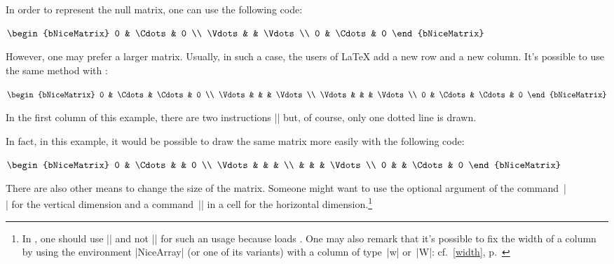 \documentclass[dvipsnames]{article}
\def\interitem{\vspace{7mm plus 2 mm minus 3mm}}
\begin{document}
\interitem In order to represent the null matrix, one can use the following
code:

\nobreak
\bigskip
\begin{Code}[width=10cm,show-output]
$\begin{bNiceMatrix}
0      & \Cdots & 0      \\
\Vdots &        & \Vdots \\
0      & \Cdots & 0 
\end{bNiceMatrix}$
\end{Code}

\bigskip
However, one may prefer a larger matrix. Usually, in such a case, the users of
LaTeX add a new row and a new column. It's possible to use the same method
with :

\nobreak
\bigskip
\begin{Code}[width=10cm,show-output]
$\begin{bNiceMatrix}
0      & \Cdots & \Cdots & 0      \\
\Vdots &        &        & \Vdots \\
\Vdots &        &        & \Vdots \\
0      & \Cdots & \Cdots & 0 
\end{bNiceMatrix}$
\end{Code}

\bigskip
In the first column of this example, there are two instructions |\Vdots| but,
of course, only one dotted line is drawn.

\bigskip
In fact, in this example, it would be possible to draw the same matrix more
easily with the following code:

\nobreak
\bigskip
\begin{Code}[width=10cm,show-output]
$\begin{bNiceMatrix}
0       & \Cdots &        & 0      \\
\Vdots  &        &        &        \\
        &        &        & \Vdots \\
0       &        & \Cdots & 0 
\end{bNiceMatrix}$
\end{Code}

\bigskip 
There are also other means to change the size of the matrix. Someone might
want to use the optional argument of the command~|\\| for the vertical
dimension and a command~|\hspace*| in a cell for the horizontal
dimension.\footnote{In , one should use |\hspace*| and not
|\hspace| for such an usage because  loads . One
may also remark that it's possible to fix the width of a column by using the
environment |{NiceArray}| (or one of its variants) with a column of type~|w|
or~|W|: cf.~\ref{width}, p.~\pageref{width}} 
\end{document}
